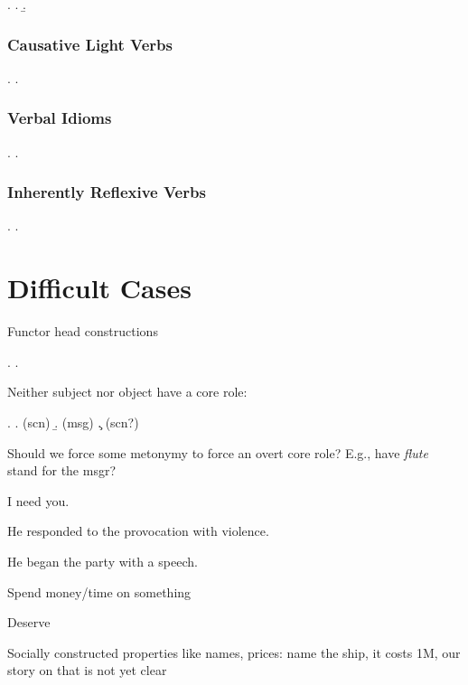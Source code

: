 \documentclass[a4paper]{article}
\begin{document}
\ex.
\a. 
\b. 

\subsubsection{Causative Light Verbs}

\ex.
\a. 

\subsubsection{Verbal Idioms}

\ex.
\a. 

\subsubsection{Inherently Reflexive Verbs}

\ex.
\a. 


\clearpage
\section{Difficult Cases}

Functor head constructions

\ex. \a. 

Neither subject nor object have a core role:

\ex. \a.  (scn)
     \b.  (msg)
     \c.  (scn?)

Should we force some metonymy to force an overt core role? E.g., have \emph{flute} stand for the msgr?

I need you.

He responded to the provocation with violence.

He began the party with a speech.

Spend money/time on something

Deserve

Socially constructed properties like names, prices: name the ship, it costs 1M, our story on that is not yet clear
\end{document}
